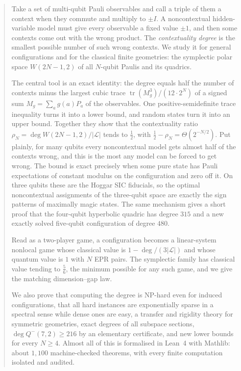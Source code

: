 \documentclass[a4paper,onecolumn,11pt,unpublished,nopdfoutputerror]{quantumarticle}
\theoremstyle{definition}
\renewcommand{\deg}{\operatorname{deg}}
\newcommand{\Lines}{\mathcal{L}}
\newcommand{\tr}{\operatorname{tr}}
\newcommand{\W}[1]{W(#1,2)}
\newcommand{\Qm}[1]{Q^{-}(#1,2)}
\begin{document}
\begin{abstract}
Take a set of multi-qubit Pauli observables and call a triple of them a context when they commute and multiply to
$\pm I$. A noncontextual hidden-variable model must give every observable a fixed value $\pm1$, and then some
contexts come out with the wrong product. The \emph{contextuality degree} is the smallest possible number of such
wrong contexts. We study it for general configurations and for the classical finite geometries: the symplectic
polar space $\W{2N-1}$ of all $N$-qubit Paulis and its quadrics.

The central tool is an exact identity: the degree equals half the number of contexts minus the largest cubic
trace $\tr(M_g^3)/(12\cdot2^N)$ of a signed sum $M_g=\sum_a g(a)P_a$ of the observables. One positive-semidefinite
trace inequality turns it into a lower bound, and random states turn it into an upper bound. Together they show
that the contextuality ratio $\rho_N=\deg\W{2N-1}/|\Lines|$ tends to $\tfrac12$, with
$\tfrac12-\rho_N=\Theta(2^{-N/2})$. Put plainly, for many qubits every noncontextual model gets almost half of the
contexts wrong, and this is the most any model can be forced to get wrong. The bound is exact precisely when some
pure state has Pauli expectations of constant modulus on the configuration and zero off it. On three qubits these
are the Hoggar SIC fiducials, so the optimal noncontextual assignments of the three-qubit space are exactly the
sign patterns of maximally magic states. The same mechanism gives a short proof that the four-qubit hyperbolic
quadric has degree $315$ and a new exactly solved five-qubit configuration of degree $480$.

Read as a two-player game, a configuration becomes a linear-system nonlocal game whose classical value is
$1-\deg/(3|\Lines|)$ and whose quantum value is $1$ with $N$ EPR pairs. The symplectic family has classical value
tending to $\tfrac56$, the minimum possible for any such game, and we give the matching dimension--gap law.

We also prove that computing the degree is NP-hard even for induced configurations, that all hard instances are
exponentially sparse in a spectral sense while dense ones are easy, a transfer and rigidity theory for symmetric
geometries, exact degrees of all subspace sections, $\deg\Qm7\ge216$ by an elementary certificate, and new lower
bounds for every $N\ge4$. Almost all of this is formalised in Lean~4 with Mathlib: about $1{,}100$ machine-checked
theorems, with every finite computation isolated and audited.
\end{abstract}
\end{document}
